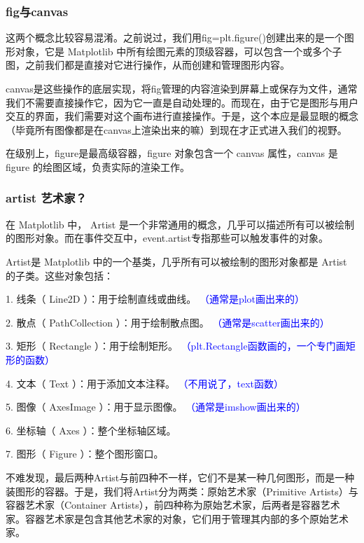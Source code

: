\documentclass[12pt]{article}
\begin{document}
\subsubsection{fig与canvas}
这两个概念比较容易混淆。之前说过，我们用fig=plt.figure()创建出来的是一个图形对象，它是 Matplotlib 中所有绘图元素的顶级容器，可以包含一个或多个子图，之前我们都是直接对它进行操作，从而创建和管理图形内容。

canvas是这些操作的底层实现，将fig管理的内容渲染到屏幕上或保存为文件，通常我们不需要直接操作它，因为它一直是自动处理的。而现在，由于它是图形与用户交互的界面，我们需要对这个画布进行直接操作。于是，这个本应是最显眼的概念（毕竟所有图像都是在canvas上渲染出来的嘛）到现在才正式进入我们的视野。

在级别上，figure是最高级容器，figure 对象包含一个 canvas 属性，canvas 是 figure 的绘图区域，负责实际的渲染工作。

\subsubsection{artist 艺术家？}
在 Matplotlib 中，  Artist   是一个非常通用的概念，几乎可以描述所有可以被绘制的图形对象。而在事件交互中，event.artist专指那些可以触发事件的对象。

 Artist是 Matplotlib 中的一个基类，几乎所有可以被绘制的图形对象都是   Artist   的子类。这些对象包括：
 
 1. 线条（  Line2D  ）：用于绘制直线或曲线。 \textcolor{blue}{（通常是plot画出来的）}
 
 2. 散点（  PathCollection  ）：用于绘制散点图。  \textcolor{blue}{（通常是scatter画出来的）}
 
 3. 矩形（  Rectangle  ）：用于绘制矩形。  \textcolor{blue}{（plt.Rectangle函数画的，一个专门画矩形的函数）}
 
 4. 文本（  Text  ）：用于添加文本注释。  \textcolor{blue}{（不用说了，text函数）}
 
 5. 图像（  AxesImage  ）：用于显示图像。  \textcolor{blue}{（通常是imshow画出来的）}
 
 6. 坐标轴（  Axes  ）：整个坐标轴区域。  
 
 7. 图形（  Figure  ）：整个图形窗口。 

不难发现，最后两种Artist与前四种不一样，它们不是某一种几何图形，而是一种装图形的容器。于是，我们将Artist分为两类：原始艺术家（Primitive Artists）与容器艺术家（Container Artists），前四种称为原始艺术家，后两者是容器艺术家。容器艺术家是包含其他艺术家的对象，它们用于管理其内部的多个原始艺术家。
\end{document}
